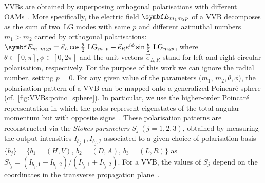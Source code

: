 
\acfp{VVB} are obtained by superposing orthogonal polarisations with different \acp{OAM}~\cite{padgett2004lights}.
More specifically, the electric field $\bs{E}_{m_1m_2p}$ of a \ac{VVB} decomposes as the sum of two~\ac{LG} modes with same $p$ and different azimuthal numbers $m_1>m_2$ carried by orthogonal polarisations:
$\bs{E}_{m_1m_2p}=\Vec{e}_L \cos{ \frac{\theta}{2}}\text{ LG$_{m_1p}$} +\Vec{e}_R e^{i \phi} \sin{ \frac{\theta}{2}}\text{ LG$_{m_2p}$}$,
where $\theta\in[0,\pi], \phi\in[0,2\pi]$ and the unit vectors $\Vec{e}_{L,R}$ stand for left and right circular polarisation, respectively.
For the purpose of this work we can ignore the radial number, setting $p=0$.
For any given value of the parameters $(m_1$, $m_2, \theta, \phi)$, the polarisation pattern of a \ac{VVB} can be mapped onto a generalized Poincar\'e sphere (cf.~\cref{fig:VVBs:poinc_sphere}). In particular, we use the higher-order Poincar\'e representation in which the poles represent eigenstates of the total angular momentum but with opposite signs~\cite{milione2011higherorder}.
These polarisation patterns are reconstructed via the \emph{Stokes parameters} $S_{j}~(j=1,2,3)$, obtained by
measuring the output intensities $I_{b_j,1},I_{b_j,2}$ associated to a given choice of polarisation basis $\{b_j \}=\{b_1=( H,V )$, $b_2=( D,A )$, $b_3=( L,R )\}$ as $S_{b_j}=(I_{b_j,1}-I_{b_j,2})/(I_{b_j,1}+I_{b_j,2})$.
For a \ac{VVB}, the values of $S_j$ depend on the coordinates in the transverse propagation plane~\cite{cardano2012polarization}.


